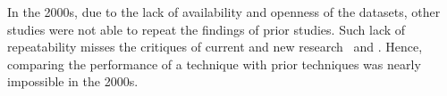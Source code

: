 
In the 2000s, due to the lack of availability and openness of the datasets, other studies were not able to repeat the findings of prior studies. Such lack of repeatability misses the critiques of current and new research~\cite{Shepperd2013TSE} and \cite{Ghotra2015ICSE}. Hence, comparing the performance of a technique with prior techniques was nearly impossible in the 2000s.



